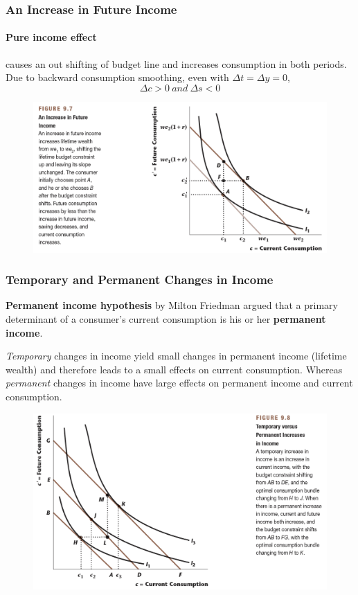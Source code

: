 \documentclass[11pt]{article}
\begin{document}
		\subsubsection{An Increase in Future Income}
		\paragraph{Pure income effect} causes an out shifting of budget line and increases consumption in both periods. Due to backward consumption smoothing, even with $\Delta t = \Delta y = 0$,
		\[
			\Delta c > 0\ and\ \Delta s < 0
		\]
		\begin{figure}[h]
			\centering
			\includegraphics[width=\linewidth]{figures/97}
		\end{figure}
		
		\newpage
		\subsubsection{Temporary and Permanent Changes in Income}
		\begin{definition}
			\textbf{Permanent income hypothesis} by Milton Friedman argued that a primary determinant of a consumer's current consumption is his or her \textbf{permanent income}.
		\end{definition}
		\par \emph{Temporary} changes in income yield small changes in permanent income (lifetime wealth) and therefore leads to a small effects on current consumption. Whereas \emph{permanent} changes in income have large effects on permanent income and current consumption.
		
		\begin{figure}[h]
			\centering
			\includegraphics[width=\linewidth]{figures/98}
		\end{figure}
		
\end{document}
